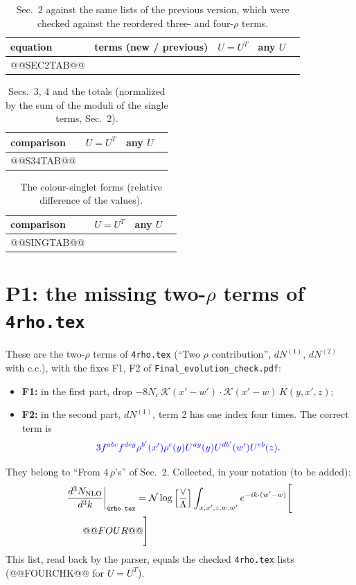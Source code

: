 \documentclass[10pt]{article}
\numberwithin{equation}{section}
\newcommand{\new}[1]{{\color{blue}#1}}
\newcommand{\old}[1]{{\color{red}#1}}
\newcommand{\NN}{\mathcal N}
\begin{document}
\begin{table}[H]\centering\small
\caption{Sec.~2 against the same lists of the previous version, which were checked against the reordered three- and four-$\rho$ terms.}\label{tab:sec2}
\begin{tabular}{@{}lcccc@{}}\toprule
equation & terms (new / previous) & $U=U^T$ & any $U$ & \\\midrule
@@SEC2TAB@@
\bottomrule
\end{tabular}
\end{table}

\begin{table}[H]\centering\small
\caption{Secs.~3, 4 and the totals (normalized by the sum of the moduli of the single terms, Sec.~2).}\label{tab:s34}
\begin{tabular}{@{}lccl@{}}\toprule
comparison & $U=U^T$ & any $U$ & \\\midrule
@@S34TAB@@
\bottomrule
\end{tabular}
\end{table}

\begin{table}[H]\centering\small
\caption{The colour-singlet forms (relative difference of the values).}\label{tab:sing}
\begin{tabular}{@{}lccl@{}}\toprule
comparison & $U=U^T$ & any $U$ & \\\midrule
@@SINGTAB@@
\bottomrule
\end{tabular}
\end{table}

\section{P1: the missing two-\texorpdfstring{$\rho$}{rho} terms of \texttt{4rho.tex}}\label{sec:p1}
These are the two-$\rho$ terms of \texttt{4rho.tex} (``Two $\rho$ contribution'', $dN^{(1)}$, $dN^{(2)}$ with c.c.), with the fixes F1, F2 of \texttt{Final\_evolution\_check.pdf}:
\begin{itemize}
\item \textbf{F1:} in the first part, drop \old{$-8N_c\,\mathcal K(x'-w')\cdot\mathcal K(x'-w)\,K(y,x',z)$};
\item \textbf{F2:} in the second part, $dN^{(1)}$, term 2 has one index four times. The correct term is
\begin{equation*}\new{3f^{abc}f^{deg}\rho^{b'}(x')\rho^c(y)U^{ag}(y)U^{db'}(w')U^{eb}(z)}.\end{equation*}
\end{itemize}
They belong to ``From $4\,\rho$'s'' of Sec.~2. Collected, in your notation (\new{to be added}):
\begin{align}
\frac{d^3N_{\rm NLO}}{d^3k}\bigg|_{\texttt{4rho.tex}}={}&\NN\log\Big[\frac{\vee}{\Lambda}\Big]\int_{x,x',z,w,w'}e^{-ik\cdot(w'-w)}\Bigg[\notag\\
@@FOUR@@\Bigg]\label{eq:four}
\end{align}
This list, read back by the parser, equals the checked \texttt{4rho.tex} lists (@@FOURCHK@@ for $U=U^T$).
\end{document}
